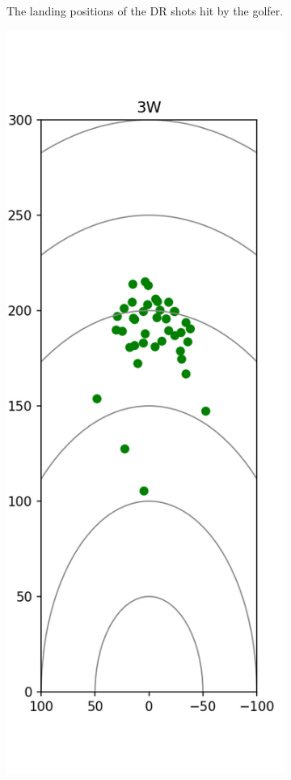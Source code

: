 \documentclass{kththesis}
\begin{document}
\begin{figure}
\begin{subfigure}{0.4\textwidth}
    \caption{The landing positions of the DR shots hit by the golfer.}
    \label{fig:DR_shots}
    \end{subfigure}
    \begin{subfigure}{0.4\textwidth}
    \centering
    \includegraphics[height=0.4\textheight]{Shots/3W_shots.png} 

\end{subfigure}
\end{figure}
\end{document}
